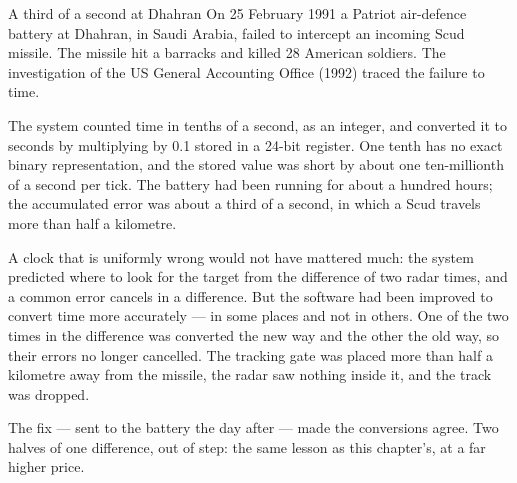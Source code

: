 \begin{curiosity}{A third of a second at Dhahran}
On 25 February 1991 a Patriot air-defence battery at Dhahran, in Saudi Arabia, failed to intercept an incoming Scud missile. The missile hit a barracks and killed 28 American soldiers. The investigation of the US General Accounting Office (1992) traced the failure to time.

The system counted time in tenths of a second, as an integer, and converted it to seconds by multiplying by 0.1 stored in a 24-bit register. One tenth has no exact binary representation, and the stored value was short by about one ten-millionth of a second per tick. The battery had been running for about a hundred hours; the accumulated error was about a third of a second, in which a Scud travels more than half a kilometre.

A clock that is uniformly wrong would not have mattered much: the system predicted where to look for the target from the difference of two radar times, and a common error cancels in a difference. But the software had been improved to convert time more accurately — in some places and not in others. One of the two times in the difference was converted the new way and the other the old way, so their errors no longer cancelled. The tracking gate was placed more than half a kilometre away from the missile, the radar saw nothing inside it, and the track was dropped.

The fix — sent to the battery the day after — made the conversions agree. Two halves of one difference, out of step: the same lesson as this chapter's, at a far higher price.
\end{curiosity}

